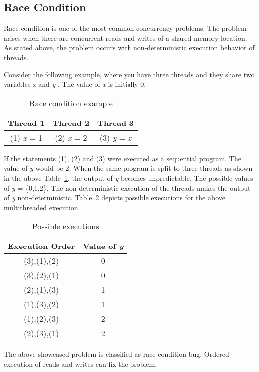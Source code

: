 \subsection{Race Condition}

Race condition is one of the most common concurrency problems.  
The problem arises when there are concurrent reads and writes of a shared memory location. 
As stated above, the problem occurs with non-deterministic execution behavior of threads. 

Consider the following example, where you have three threads and they share two variables \emph{x} and \emph{y} \cite{carver2005modern}. 
The value of \emph{x} is initially 0. 

\begin{table}[h]
\centering
\begin{tabular}{*{3}{c}}
Thread 1 & Thread 2 & Thread 3 \\
\hline
 (1) \emph{x} = 1 & (2) \emph{x} = 2 & (3) \emph{y} = \emph{x}\\
\end{tabular}
\caption{Race condition example}
\label{race_cond}
\end{table}

If the statements (1), (2) and (3) were executed as a sequential program. 
The value of \emph{y} would be 2. 
When the same program is split to three threads as shown in the above Table~\ref{race_cond}, the output of \emph{y} becomes unpredictable. 
The possible values of \emph{y} = \{0,1,2\}. 
The non-deterministic execution of the threads makes the output of \emph{y} non-deterministic. 
Table~\ref{poss_exec} depicts possible executions for the above multithreaded execution. 

\begin{table}[h]
\centering
\begin{tabular}{*{2}{c}}
Execution Order & Value of \emph{y} \\
\hline
 (3),(1),(2)& 0\\
 (3),(2),(1)& 0\\
 (2),(1),(3)& 1\\
 (1),(3),(2)& 1\\
 (1),(2),(3)& 2\\
 (2),(3),(1)& 2\\
\end{tabular}
\caption{Possible executions}
\label{poss_exec}
\end{table}

The above showcased problem is classified as race condition bug. 
Ordered execution of reads and writes can fix the problem. 

